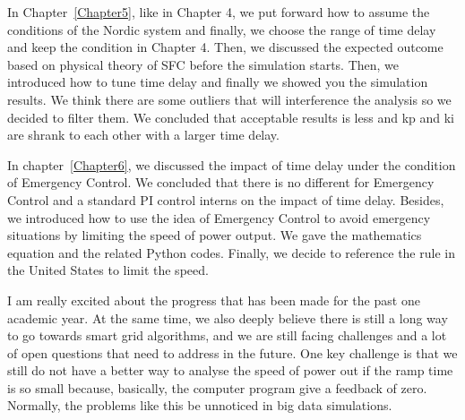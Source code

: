 In Chapter~\ref{Chapter5}, like in Chapter 4, we put forward how to assume the conditions of the Nordic system and finally, we choose the range of time delay and keep the condition in Chapter 4. Then, we discussed the expected outcome based on physical theory of SFC before the simulation starts. Then, we introduced how to tune time delay and finally we showed you the simulation results. We think there are some outliers that will interference the analysis so we decided to filter them. We concluded that acceptable results is less and kp and ki are shrank to each other with a larger time delay. 

In chapter~\ref{Chapter6}, we discussed the impact of time delay under the condition of  Emergency Control. We concluded that there is no different for Emergency Control and a standard PI control interns on the impact of time delay. Besides, we introduced how to use the idea of Emergency Control to avoid emergency situations by limiting the speed of power output. We gave the mathematics equation and the related Python codes. Finally, we decide to reference the rule in the United States to limit the speed. 

I am really excited about the progress that has been made for the past one academic year. At the same time, we also deeply believe there is still a long way to go towards smart grid algorithms, and we are still facing challenges and a lot of open questions that need to address in the future. One key challenge is that we still do not have a better way to analyse the speed of power out if the ramp time is so small because, basically, the computer program give a feedback of zero. Normally, the problems like this be unnoticed in big data simulations. 
